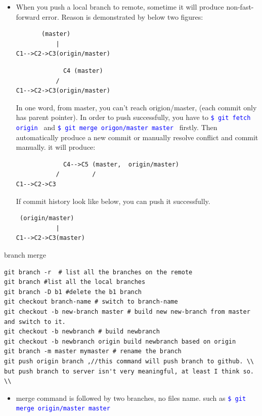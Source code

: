 \documentclass[a4paper,12pt,twoside]{book}
\newcommand{\linuxcommand}[1]{\texttt{\textcolor{blue}{\$ #1 \Pisymbol{psy}{191}}}}
\begin{document}
\begin{description}
\begin{itemize}
\item When you push a local branch to remote, sometime it will produce non-fast-forward error. Reason is
    demonstrated by below two figures:
\begin{verbatim}
       (master)
           |
C1-->C2->C3(origin/master)
\end{verbatim}

\begin{verbatim}
             C4 (master)
           /
C1-->C2->C3(origin/master)
\end{verbatim}
In one word, from master, you can't reach origion/master, (each commit only has parent pointer).  In order to
push successfully, you have to \linuxcommand{git fetch origin} and \linuxcommand{git merge origon/master
master} firstly. Then automatically produce a new commit or manually resolve conflict and commit manually. it
will produce:
\begin{verbatim}
             C4-->C5 (master,  origin/master)
           /         /
C1-->C2->C3
\end{verbatim}

\par

If commit history look like below, you can push it successfully.
\begin{verbatim}
 (origin/master)
           |
C1-->C2->C3(master)
\end{verbatim}
\end{itemize}


\item {branch merge}

\begin{verbatim}
git branch -r  # list all the branches on the remote
git branch #list all the local branches
git branch -D b1 #delete the b1 branch
git checkout branch-name # switch to branch-name
git checkout -b new-branch master # build new new-branch from master and switch to it.
git checkout -b newbranch # build newbranch
git checkout -b newbranch origin build newbranch based on origin
git branch -m master mymaster # rename the branch
git push origin branch ,//this command will push branch to github. \\
but push branch to server isn't very meaningful, at least I think so. \\
\end{verbatim}

\begin{itemize}
  \item merge command is followed by two branches, no files name.  such as \linuxcommand{git merge
      origin/master master}


\end{itemize}
\end{description}
\end{document}
